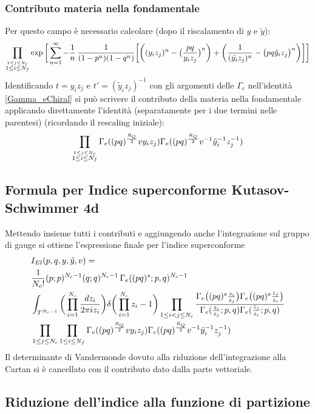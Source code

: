 \documentclass[a4paper,12pt]{article}
\begin{document}
\subsubsection{Contributo materia nella fondamentale}
Per questo campo è necessario calcolare (dopo il riscalamento di $y$ e $\tilde y$):
\begin{align*}
\prod_{\overset{ 1 \leq j \leq N_c}{ 1 \leq i \leq N_f}} \exp \bigg[ \sum_{n=1}^{\infty} - {1 \over n} \, {1 \over (1-p^n)( 1-q^n)}
\bigg[ \bigg( (y_i z_j)^n - \big({ pq \over y_i z_j}\big)^n \bigg) + \bigg( {1 \over  (\tilde{y_i} z_j)^n } - \big( { pq \tilde y_i z_j} \big)^n\bigg) \bigg] \bigg]
\end{align*}
Identificando $ t = y_i z_j$ e $ t' = (\tilde y_i z_j)^{-1}$ con gli argomenti delle $\Gamma_e$ nell'identità \ref{Gamma_eChiral} si può scrivere il contributo della materia nella fondamentale applicando direttamente l'identità (separatamente per i due termini nelle parentesi) (ricordando il rescaling iniziale):
$$
\prod_{\overset{ 1 \leq j \leq N_c}{ 1 \leq i \leq N_f}} \Gamma_e ( (pq)^{R_Q \over 2} v y_i z_j )
\Gamma_e ( (pq)^{R_Q \over 2} v^{-1} {\tilde y_i}^{-1} z_j^{-1})
$$
\subsection{Formula per Indice superconforme Kutasov-Schwimmer 4d}
Mettendo insieme tutti i contributi e aggiungendo anche l'integrazione sul gruppo di gauge si ottiene l'espressione finale per l'indice superconforme
\begin{align*}
&I_{El} ( p,q,y,\tilde y , v) = \\
 & { 1 \over N_c !} (p;p)^{N_c-1} ( q;q)^{N_c-1} \, \Gamma_e( (pq)^s;p,q)^{N_c-1} \\
&\int_{T^{N_c-1}} \bigg( \prod_{i=1}^{N_c } { d z_i \over { 2 \pi i z_i} } \bigg) \delta \bigg( \prod_{i=1}^{N_c} z_i - 1 \bigg) 
\prod_{ 1 \leq i < j \leq N_c} \frac{ \Gamma_e \big( (pq)^s {z_i \over z_j} \big) \Gamma_e \big( (pq)^s {z_j \over z_i} \big) }{ \Gamma_e( {z_i \over z_j};p,q) \Gamma_e({z_j \over z_i}; p,q)} \\
& \prod_{ 1 \leq j \leq N_c} \prod_{ 1 \leq i \leq N_f} \Gamma_e ( (pq)^{R_Q \over 2} v y_i z_j )
\Gamma_e ( (pq)^{R_Q \over 2} v^{-1} {\tilde y_i}^{-1} z_j^{-1})
\end{align*}
Il determinante di Vandermonde dovuto alla riduzione dell'integrazione alla Cartan si è cancellato con il contributo dato dalla parte vettoriale.
\subsection{Riduzione dell'indice alla funzione di partizione}
\end{document}
